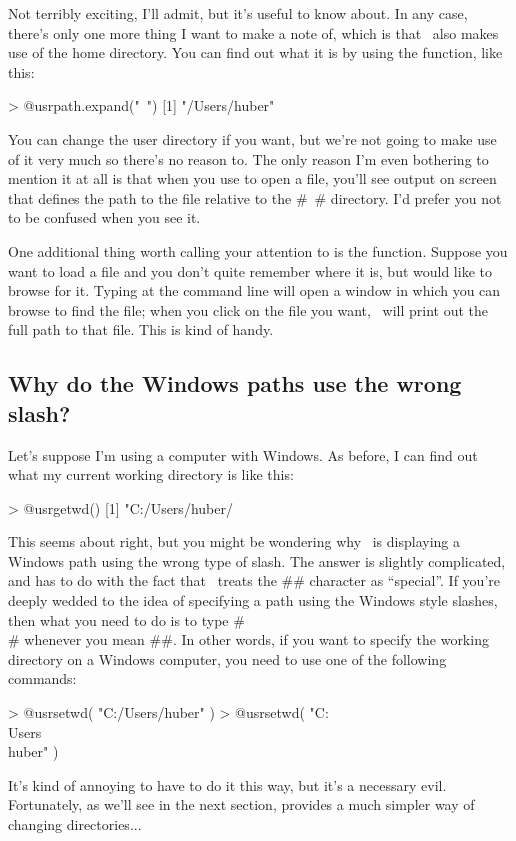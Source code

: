 Not terribly exciting, I'll admit, but it's useful to know about. In any case, there's only one more thing I want to make a note of, which is that \R\ also makes use of the home directory. You can find out what it is by using the  function, like this:
\begin{rblock1}
> @usr{path.expand("~")}
[1] "/Users/huber"
\end{rblock1}
You can change the user directory if you want, but we're not going to make use of it very much so there's no reason to. The only reason I'm even bothering to mention it at all is that when you use \Rstudio to open a file, you'll see output on screen that defines the path to the file relative to  the \rtextverb#~# directory. I'd prefer you not to be confused when you see it.

One additional thing worth calling your attention to is the  function. Suppose you want to load a file and you don't quite remember where it is, but would like to browse for it. Typing  at the command line will open a window in which you can browse to find the file; when you click on the file you want, \R\ will print out the full path to that file. This is kind of handy.




\subsection{Why do the Windows paths use the wrong slash?}

Let's suppose I'm using a computer with Windows. As before, I can find out what my current working directory is like this:
\begin{rblock1}
> @usr{getwd()}
[1] "C:/Users/huber/
\end{rblock1}
This seems about right, but you might be wondering why \R\ is displaying a Windows path using the wrong type of slash. The answer is slightly complicated, and has to do with the fact that \R\ treats the \rtextverb#\# character as ``special''. If you're deeply wedded to the idea of specifying a path using the Windows style slashes, then what you need to do is to type \rtextverb#\\# whenever you mean \rtextverb#\#. In other words, if you want to specify the working directory on a Windows computer, you need to use one of the following commands:
\begin{rblock1}
> @usr{setwd( "C:/Users/huber" )}
> @usr{setwd( "C:\\Users\\huber" )}
\end{rblock1}
It's kind of annoying to have to do it this way, but it's a necessary evil. Fortunately, as we'll see in the next section, \Rstudio provides a much simpler way of changing directories...

